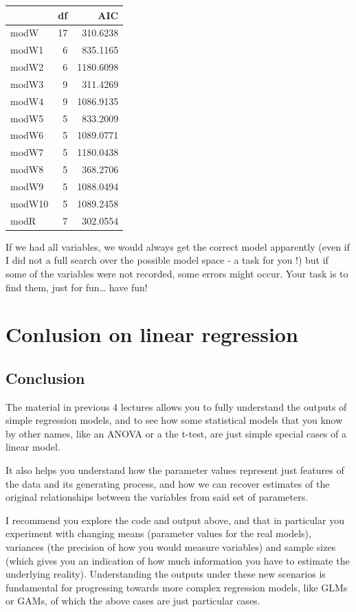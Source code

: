 \documentclass[
]{book}
\begin{document}
\begin{tabular}{l|r|r}
\hline
  & df & AIC\\
\hline
modW & 17 & 310.6238\\
\hline
modW1 & 6 & 835.1165\\
\hline
modW2 & 6 & 1180.6098\\
\hline
modW3 & 9 & 311.4269\\
\hline
modW4 & 9 & 1086.9135\\
\hline
modW5 & 5 & 833.2009\\
\hline
modW6 & 5 & 1089.0771\\
\hline
modW7 & 5 & 1180.0438\\
\hline
modW8 & 5 & 368.2706\\
\hline
modW9 & 5 & 1088.0494\\
\hline
modW10 & 5 & 1089.2458\\
\hline
modR & 7 & 302.0554\\
\hline
\end{tabular}

If we had all variables, we would always get the correct model apparently (even if I did not a full search over the possible model space - a task for you !) but if some of the variables were not recorded, some errors might occur. Your task is to find them, just for fun\ldots{} have fun!

\hypertarget{conlusion-on-linear-regression}{%
\chapter{Conlusion on linear regression}\label{conlusion-on-linear-regression}}

\hypertarget{conclusion}{%
\section{Conclusion}\label{conclusion}}

The material in previous 4 lectures allows you to fully understand the outputs of simple regression models, and to see how some statistical models that you know by other names, like an ANOVA or a the t-test, are just simple special cases of a linear model.

It also helps you understand how the parameter values represent just features of the data and its generating process, and how we can recover estimates of the original relationships between the variables from said set of parameters.

I recommend you explore the code and output above, and that in particular you experiment with changing means (parameter values for the real models), variances (the precision of how you would measure variables) and sample sizes (which gives you an indication of how much information you have to estimate the underlying reality). Understanding the outputs under these new scenarios is fundamental for progressing towards more complex regression models, like GLMs or GAMs, of which the above cases are just particular cases.
\end{document}
